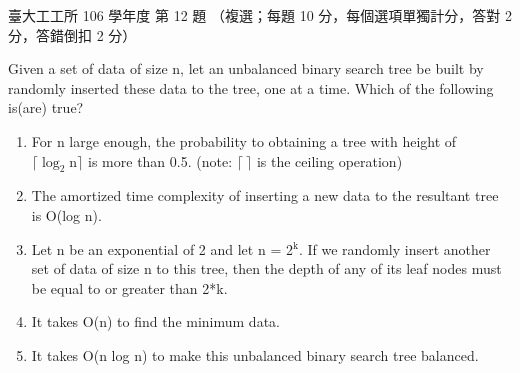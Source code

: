 \begin{pastexam}[label={px:ntu-106-ie-ds-12}]{臺大工工所 106 學年度 第 12 題}
（複選；每題 10 分，每個選項單獨計分，答對 2 分，答錯倒扣 2 分）

Given a set of data of size n, let an unbalanced binary search tree be built by randomly inserted these
data to the tree, one at a time. Which of the following is(are) true?
\begin{enumerate}[label=(\Alph*),nosep]
\item For n large enough, the probability to obtaining a tree with height of $\lceil \log_2 \mathrm{n}\rceil$
is more than 0.5. (note: $\lceil\ \rceil$ is the ceiling operation)
\item The amortized time complexity of inserting a new data to the resultant tree is O(log n).
\item Let n be an exponential of 2 and let n = 2$^{\mathrm{k}}$. If we randomly insert another set of data of
size n to this tree, then the depth of any of its leaf nodes must be equal to or greater than 2*k.
\item It takes O(n) to find the minimum data.
\item It takes O(n log n) to make this unbalanced binary search tree balanced.
\end{enumerate}
\end{pastexam}

